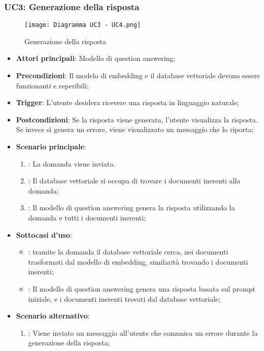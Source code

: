 \newpage
\hypertarget{UC3}{}
\subsubsection{UC3: Generazione della risposta}

\begin{figure}[h]
    \centering
    \texttt{[image: Diagramma UC3 - UC4.png]}
    \caption{Generazione della risposta}
\end{figure}

\begin{itemize}
    \item \textbf{Attori principali}: Modello di question answering;
    \item \textbf{Precondizioni}: Il modelo di embedding e il database vettoriale devono essere funzionanti e reperibili;
    \item \textbf{Trigger}: L'utente desidera ricevere una risposta in linguaggio naturale;
    \item \textbf{Postcondizioni}: Se la risposta viene generata, l'utente visualizza la risposta. Se invece si genera un errore, viene visualizzato un messaggio che lo riporta;
    \item \textbf{Scenario principale}:
    \begin{enumerate}
        \item {}: La domanda viene inviata.
        \item {}: Il database vettoriale si occupa di trovare i documenti inerenti alla domanda;
        \item {}: Il modello di question answering genera la risposta utilizzando la domanda e tutti i documenti inerenti;
    \end{enumerate}
    \item \textbf{Sottocasi d'uso}:
    \begin{itemize}
        \item {}: tramite la domanda il database vettoriale cerca, nei documenti trasformati dal modello di embedding, similarità trovando i documenti inerenti;
        \item {}: Il modello di question answering genera una risposta basata sul prompt iniziale, e i documenti inerenti trovati dal database vettoriale;
    \end{itemize}
    \item \textbf{Scenario alternativo}:
    \begin{enumerate}
        \item {}: Viene inviato un messaggio all'utente che comunica un errore durante la generazione della risposta;
    \end{enumerate}
\end{itemize}


